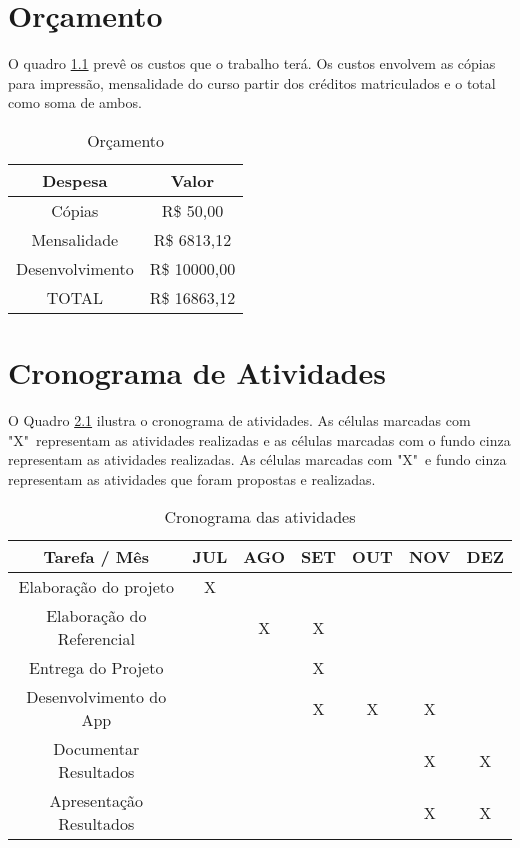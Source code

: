 \appendix
\renewcommand{\thechapter}{APÊNDICE I -}
\chapter{Orçamento}
O quadro \ref{tab:my_table_orcamento} prevê os custos que o trabalho terá. Os custos envolvem as cópias para impressão, mensalidade do curso partir dos créditos matriculados e o total como soma de ambos.
\begin{table}[htb]
    \caption{Orçamento}
    \label{tab:my_table_orcamento}
    \centering
    \begin{tabular}{|c|c|}
        \hline
         Despesa & Valor \\ 
         \hline
         Cópias & R\$ 50,00\\
         \hline
         Mensalidade & R\$ 6813,12\\
         \hline
         Desenvolvimento & R\$ 10000,00\\
         \hline
         TOTAL & R\$ 16863,12\\
         \hline
    \end{tabular}
\end{table}

\renewcommand{\thechapter}{APÊNDICE II -}
\chapter{Cronograma de Atividades} \label{sec:schedule_activities_table}
 
O Quadro \ref{tab:my_table_cronograma} ilustra o cronograma de atividades. As células marcadas com "X"\ representam as atividades realizadas e as células marcadas com o fundo cinza representam as atividades realizadas. As células marcadas com "X"\ e fundo cinza representam as atividades que foram propostas e realizadas.

\begin{table}[htb]
    \caption{Cronograma das atividades}
    \label{tab:my_table_cronograma}
    \centering
    \begin{tabular}{|c|c|c|c|c|c|c|}
        \hline 
         Tarefa / Mês & JUL & AGO & SET & OUT & NOV & DEZ\\ 
         \hline
         Elaboração do projeto & X\cellcolor{gray!50}  & & & & &\\
         \hline
         Elaboração do Referencial & & X\cellcolor{gray!50} & X\cellcolor{gray!50} & & &\\
         \hline
         Entrega do Projeto & &  & X\cellcolor{gray!50} & & &\\
         \hline
         
         Desenvolvimento do App & & & X \cellcolor{gray!50}& X\cellcolor{gray!50} & X\cellcolor{gray!50} &  \\
         \hline
         Documentar Resultados & & & & & X\cellcolor{gray!50} & X\cellcolor{gray!50}\\
         \hline
         Apresentação Resultados & & & & & X\cellcolor{gray!50} & X\cellcolor{gray!50}\\ 
         \hline
    \end{tabular}
\end{table}

